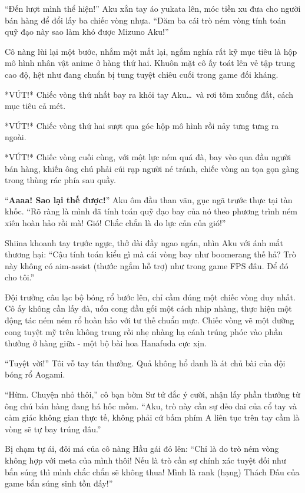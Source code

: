\documentclass[../main.tex]{subfiles}
\begin{document}
``Đến lượt mình thể hiện!'' Aku xắn tay áo yukata lên, móc tiền xu đưa cho người bán hàng để đổi lấy ba chiếc vòng nhựa. ``Dăm ba cái trò ném vòng tính toán quỹ đạo này sao làm khó được Mizuno Aku!''

Cô nàng lùi lại một bước, nhắm một mắt lại, ngắm nghía rất kỹ mục tiêu là hộp mô hình nhân vật anime ở hàng thứ hai. Khuôn mặt cô ấy toát lên vẻ tập trung cao độ, hệt như đang chuẩn bị tung tuyệt chiêu cuối trong game đối kháng.

*VÚT!* Chiếc vòng thứ nhất bay ra khỏi tay Aku\dots\ và rơi tõm xuống đất, cách mục tiêu cả mét.

*VÚT!* Chiếc vòng thứ hai sượt qua góc hộp mô hình rồi nảy tưng tưng ra ngoài.

*VÚT!* Chiếc vòng cuối cùng, với một lực ném quá đà, bay vèo qua đầu người bán hàng, khiến ông chú phải cúi rạp người né tránh, chiếc vòng an tọa gọn gàng trong thùng rác phía sau quầy.

``\textbf{Aaaa! Sao lại thế được!}'' Aku ôm đầu than vãn, gục ngã trước thực tại tàn khốc. ``Rõ ràng là mình đã tính toán quỹ đạo bay của nó theo phương trình ném xiên hoàn hảo rồi mà! Gió! Chắc chắn là do lực cản của gió!''

Shiina khoanh tay trước ngực, thở dài đầy ngao ngán, nhìn Aku với ánh mắt thương hại: ``Cậu tính toán kiểu gì mà cái vòng bay như boomerang thế hả? Trò này không có aim-assist (thước ngắm hỗ trợ) như trong game FPS đâu. Để đó cho tôi.''

Đội trưởng câu lạc bộ bóng rổ bước lên, chỉ cầm đúng một chiếc vòng duy nhất. Cô ấy không cần lấy đà, uốn cong đầu gối một cách nhịp nhàng, thực hiện một động tác ném ném rổ hoàn hảo với tư thế chuẩn mực. Chiếc vòng vẽ một đường cong tuyệt mỹ trên không trung rồi nhẹ nhàng hạ cánh trúng phóc vào phần thưởng ở hàng giữa - một bộ bài hoa Hanafuda cực xịn.

``Tuyệt vời!'' Tôi vỗ tay tán thưởng. Quả không hổ danh là át chủ bài của đội bóng rổ Aogami.

``Hừm. Chuyện nhỏ thôi,'' cô bạn bờm Sư tử đắc ý cười, nhận lấy phần thưởng từ ông chú bán hàng đang há hốc mồm. ``Aku, trò này cần sự dẻo dai của cổ tay và cảm giác không gian thực tế, không phải cứ bấm phím A liên tục trên tay cầm là vòng sẽ tự bay trúng đâu.''

Bị chạm tự ái, đôi má của cô nàng Hầu gái đỏ lên: ``Chỉ là do trò ném vòng không hợp với meta của mình thôi! Nếu là trò cần sự chính xác tuyệt đối như bắn súng thì mình chắc chắn sẽ không thua! Mình là rank (hạng) Thách Đấu của game bắn súng sinh tồn đấy!''
\end{document}
